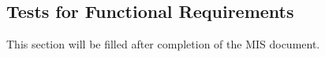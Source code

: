 \documentclass[12pt, titlepage]{article}
\begin{document}
\subsection{Tests for Functional Requirements}

This section will be filled after completion of the MIS document.






					
					
					


					

					
					
					

\end{document}
